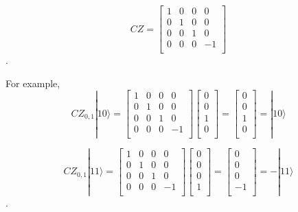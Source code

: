 \begin{equation}
CZ = \begin{bmatrix}
1 & 0 & 0 & 0 \\
0 & 1 & 0 & 0 \\
0 & 0 & 1 & 0 \\
0 & 0 & 0 & -1 \\
\end{bmatrix}
\end{equation}.

For example,
\begin{equation}
CZ_{0,1}|10\rangle = 
\begin{bmatrix}
1 & 0 & 0 & 0 \\
0 & 1 & 0 & 0 \\
0 & 0 & 1 & 0 \\
0 & 0 & 0 & -1 \\
\end{bmatrix}
 \left[
\begin{array}{c}
0 \\
0 \\
1 \\
0 \\
\end{array}
\right]
=  \left[
\begin{array}{c}
0 \\
0 \\
1 \\
0 \\
\end{array}
\right] 
= |10\rangle 
\end{equation}

\begin{equation}
CZ_{0,1}|11\rangle = 
\begin{bmatrix}
  1 & 0 & 0 & 0 \\
  0 & 1 & 0 & 0 \\
  0 & 0 & 1 & 0 \\
  0 & 0 & 0 & -1 \\
  \end{bmatrix}
 \left[
\begin{array}{c}
0 \\
0 \\
0 \\
1 \\
\end{array}
\right]
=  \left[
\begin{array}{c}
0 \\
0 \\
0 \\
-1 \\
\end{array}
\right] 
= -|11\rangle 
\end{equation}.

